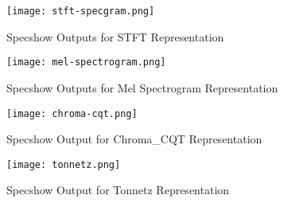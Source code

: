 \begin{figure}
  \caption{Specshow Outputs for STFT Representation}
  \texttt{[image: stft-specgram.png]}
\end{figure}
\begin{figure}
  \caption{Specshow Outputs for Mel Spectrogram Representation}
  \texttt{[image: mel-spectrogram.png]}
\end{figure}
\begin{figure}
  \caption{Specshow Output for Chroma\_CQT Representation}
  \texttt{[image: chroma-cqt.png]}
\end{figure}
\begin{figure}
  \caption{Specshow Output for Tonnetz Representation}
  \texttt{[image: tonnetz.png]}
\end{figure}
